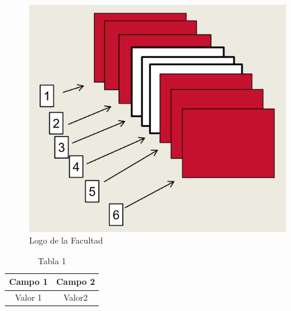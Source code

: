 \begin{conclusion}
	\lipsum[130-132]
	\begin{figure}[!h]
		\centering
		\includegraphics[scale=.2]{figures/eventos.png}
		\caption{Logo de la Facultad}
		\label{logofcfm}
	\end{figure}
	\lipsum[133-134]
	\begin{table}[!h]
		\centering
		\begin{tabular}{|c||c|}
			\hline
			Campo 1& Campo 2\\\hline
			Valor 1& Valor2\\\hline
		\end{tabular}
		\caption{Tabla 1}
		\label{tabla:1}
	\end{table}
	\lipsum[135]
\end{conclusion}